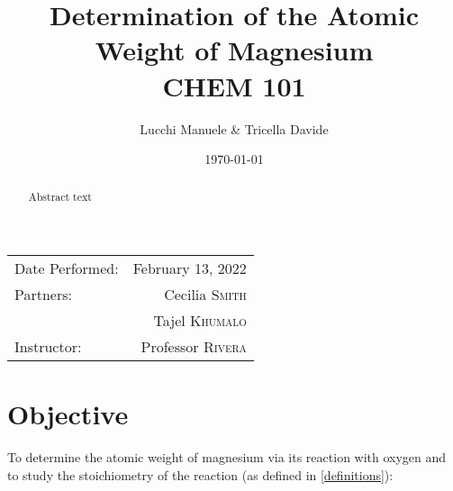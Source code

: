 \documentclass[
	letterpaper, %
	10pt, %
]{class}
\title{Determination of the Atomic \\ Weight of Magnesium \\ CHEM 101} %
\author{Lucchi Manuele \& Tricella Davide} %
\date{\today} %
\begin{document}
\maketitle %

\begin{center}
	\begin{tabular}{l r}
		Date Performed: & February 13, 2022         \\ %
		Partners:       & Cecilia \textsc{Smith}    \\ %
		                & Tajel \textsc{Khumalo}    \\
		Instructor:     & Professor \textsc{Rivera} %
	\end{tabular}
\end{center}


\begin{abstract}
	Abstract text
\end{abstract}


\section{Objective}

To determine the atomic weight of magnesium via its reaction with oxygen and to study the stoichiometry of the reaction (as defined in \ref{definitions}):

\begin{center}
\end{center}

\end{document}
